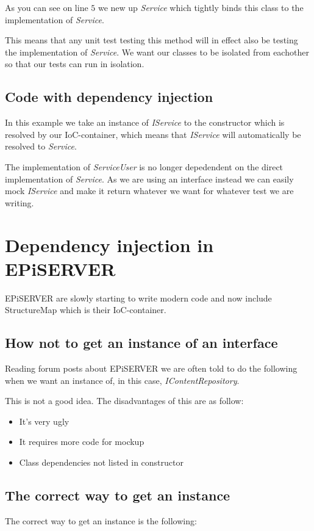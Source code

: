 \documentclass[12pt]{article}
\begin{document}
As you can see on line $5$ we new up \emph{Service} which tightly binds this class to the implementation of \emph{Service}.

This means that any unit test testing this method will in effect also be testing the implementation of \emph{Service}. We want our classes to be isolated from eachother so that our tests can run in isolation.

\subsection{Code with dependency injection}


In this example we take an instance of \emph{IService} to the constructor which is resolved by our IoC-container, which means that \emph{IService} will automatically be resolved to \emph{Service}.

The implementation of \emph{ServiceUser} is no longer depedendent on the direct implementation of \emph{Service}. As we are using an interface instead we can easily mock \emph{IService} and make it return whatever we want for whatever test we are writing.

\section{Dependency injection in EPiSERVER}
EPiSERVER are slowly starting to write modern code and now include StructureMap which is their IoC-container.

\subsection{How not to get an instance of an interface}
Reading forum posts about EPiSERVER we are often told to do the following when we want an instance of, in this case, \emph{IContentRepository}.



This is not a good idea. The disadvantages of this are as follow:
\begin{itemize}
	\item It's very ugly
	\item It requires more code for mockup
	\item Class dependencies not listed in constructor
\end{itemize}

\subsection{The correct way to get an instance}
The correct way to get an instance is the following:

\end{document}
